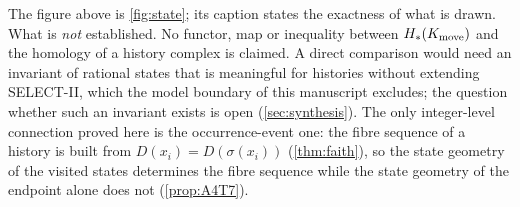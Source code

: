 \noindent The figure above is \cref{fig:state}; its caption states the exactness of what is drawn.
What is \emph{not} established. No functor, map or inequality between $H_*(K_{\mathrm{move}})$ and the homology of a history complex is claimed. A direct comparison would need an invariant of rational states that is meaningful for histories without extending SELECT-II, which the model boundary of this manuscript excludes; the question whether such an invariant exists is open (\cref{sec:synthesis}). The only integer-level connection proved here is the occurrence-event one: the fibre sequence of a history is built from $D(x_i)=D(\sigma(x_i))$ (\cref{thm:faith}), so the state geometry of the visited states determines the fibre sequence while the state geometry of the endpoint alone does not (\cref{prop:A4T7}).
